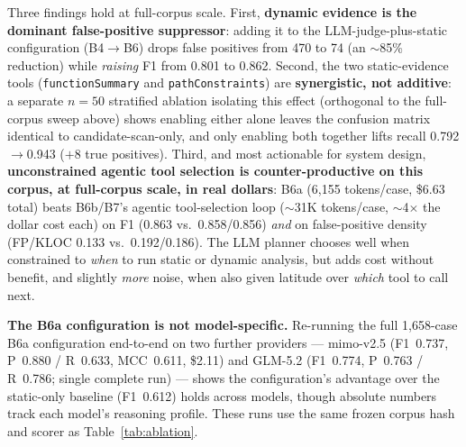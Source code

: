 \documentclass[11pt,a4paper]{article}
\begin{document}
Three findings hold at full-corpus scale. First, \textbf{dynamic evidence
is the dominant false-positive suppressor}: adding it to the
LLM-judge-plus-static configuration (B4$\to$B6) drops false positives from
470 to 74 (an $\sim$85\% reduction) while \emph{raising} F1 from 0.801 to
0.862. Second, the two static-evidence tools (\texttt{functionSummary} and
\texttt{pathConstraints}) are \textbf{synergistic, not additive}: a
separate $n{=}50$ stratified ablation isolating this effect (orthogonal to
the full-corpus sweep above) shows enabling either alone leaves the
confusion matrix identical to candidate-scan-only, and only enabling both
together lifts recall 0.792$\to$0.943 ($+8$ true positives). Third, and
most actionable for system design, \textbf{unconstrained agentic tool
selection is counter-productive on this corpus, at full-corpus scale, in
real dollars}: B6a (6{,}155 tokens/case, \$6.63 total) beats B6b/B7's
agentic tool-selection loop ($\sim$31K tokens/case, $\sim$4$\times$ the
dollar cost each) on F1 (0.863 vs.\ 0.858/0.856) \emph{and} on false-positive
density (FP/KLOC 0.133 vs.\ 0.192/0.186). The LLM planner chooses well
when constrained to \emph{when} to run static or dynamic analysis, but
adds cost without benefit, and slightly \emph{more} noise, when also
given latitude over \emph{which} tool to call next.

\textbf{The B6a configuration is not model-specific.} Re-running the full
1{,}658-case B6a configuration end-to-end on two further providers ---
mimo-v2.5 (F1~0.737, P~0.880 / R~0.633, MCC~0.611, \$2.11) and GLM-5.2
(F1~0.774, P~0.763 / R~0.786; single complete run) --- shows the
configuration's advantage over the static-only baseline (F1~0.612) holds
across models, though absolute numbers track each model's reasoning
profile. These runs use the same frozen corpus hash and scorer as
Table~\ref{tab:ablation}.
\end{document}
